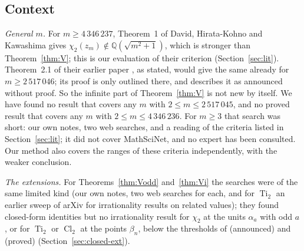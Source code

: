 \documentclass[11pt]{amsart}
\theoremstyle{definition}
\theoremstyle{remark}
\numberwithin{equation}{section}
\newcommand{\QQ}{\mathbb{Q}}
\newcommand{\Ti}{\operatorname{Ti}}
\newcommand{\Cl}{\operatorname{Cl}}
\begin{document}
\subsection{Context}\label{sec:context}
\emph{General $m$.} For $m\ge4\,346\,237$, Theorem~1 of David, Hirata-Kohno and Kawashima \cite{DHK2022b} gives
$\chi_2(z_m)\notin\QQ(\sqrt{m^2+1})$, which is stronger than Theorem~\ref{thm:V}; this is our evaluation of their
criterion (Section~\ref{sec:lit}). Theorem~2.1 of their earlier paper \cite{DHK2020}, as stated, would give the same already
for $m\ge2\,517\,046$; its proof is only outlined there, and \cite{DHK2022b} describes it as announced without proof. So
the infinite part of Theorem~\ref{thm:V} is not new by itself. We have found no result that covers any $m$ with
$2\le m\le2\,517\,045$, and no proved result that covers any $m$ with $2\le m\le4\,346\,236$. For $m\ge3$ that search
was short: our own notes, two web searches, and a reading of the criteria listed in Section~\ref{sec:lit}; it did not
cover MathSciNet, and no expert has been consulted. Our method also covers the ranges of these criteria independently,
with the weaker conclusion.

\emph{The extensions.} For Theorems~\ref{thm:Vodd} and~\ref{thm:Vi} the searches were of the same limited kind (our own
notes, two web searches for each, and for $\Ti_2$ an earlier sweep of arXiv for irrationality results on related
values); they found closed-form identities but no irrationality result for $\chi_2$ at the units $\alpha_a$ with odd
$a$, or for $\Ti_2$ or $\Cl_2$ at the points $\beta_n$, below the thresholds of \cite{DHK2020} (announced) and
\cite{DHK2022b} (proved) (Section~\ref{sec:closed-ext}).
\end{document}
